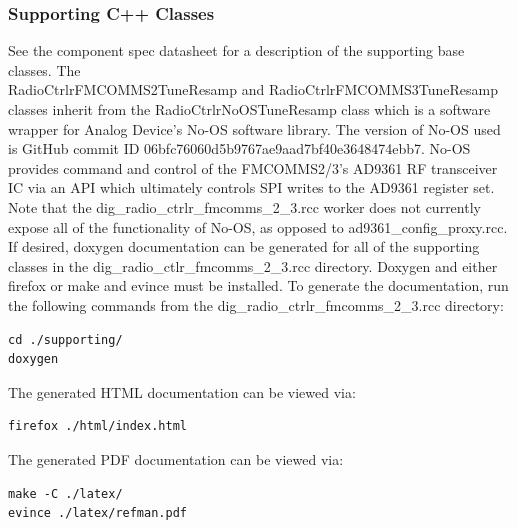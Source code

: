 \documentclass{article}
\def\comp{dig\_radio\_ctrlr\_fmcomms\_2\_3}
\begin{document}
    \subsubsection{Supporting C++ Classes}
      See the component spec
      datasheet \cite{dig_radio_ctrlr_comp_datasheet}
      for a description of the supporting base classes.
      The \\ RadioCtrlrFMCOMMS2TuneResamp and
      RadioCtrlrFMCOMMS3TuneResamp classes inherit from the
      RadioCtrlrNoOSTuneResamp class which is
      a software wrapper for Analog Device's No-OS software
      library\cite{no_os}.
      The version of No-OS used is GitHub commit ID
      06bfc76060d5b9767ae9aad7bf40e3648474ebb7\cite{no_os_06bfc76060d5b9767ae9aad7bf40e3648474ebb7}.
      No-OS provides command and control of the FMCOMMS2/3's AD9361
      RF transceiver IC\cite{ad9361} via an
      API which ultimately controls SPI writes to the
      AD9361 register
      set. Note that the \comp.rcc worker does not currently
      expose all of the
      functionality
      of No-OS, as opposed to
      ad9361\_config\_proxy.rcc\cite{ad9361_config_proxy_datasheet}.
    If desired, doxygen documentation can be generated for all
    of the supporting classes in the dig\_radio\_ctlr\_fmcomms\_2\_3.rcc
    directory. Doxygen and
    either firefox or make and evince
    must be installed. To generate
    the documentation, run the following commands from the
    dig\_radio\_ctrlr\_fmcomms\_2\_3.rcc directory:
    \begin{lstlisting}
cd ./supporting/
doxygen
    \end{lstlisting}
The generated HTML documentation can be viewed via:
    \begin{lstlisting}
firefox ./html/index.html
    \end{lstlisting}
The generated PDF documentation can be viewed via:
    \begin{lstlisting}
make -C ./latex/
evince ./latex/refman.pdf
    \end{lstlisting}
\end{document}
